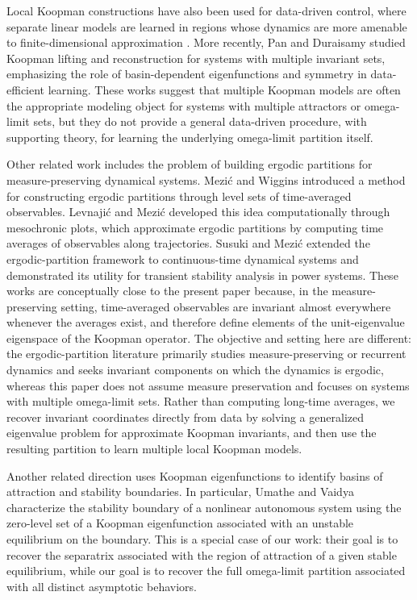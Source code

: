 \documentclass[letterpaper, 10 pt, conference]{ieeeconf}
\begin{document}
Local Koopman constructions have also been used for data-driven control, where separate linear models are learned in regions whose dynamics are more amenable to finite-dimensional approximation \cite{GM-MC-XT-TM:19}. More recently, Pan and Duraisamy \cite{SP-KD:24} studied Koopman lifting and reconstruction for systems with multiple invariant sets, emphasizing the role of basin-dependent eigenfunctions and symmetry in data-efficient learning. These works suggest that multiple Koopman models are often the appropriate modeling object for systems with multiple attractors or omega-limit sets, but they do not provide a general data-driven procedure, with supporting theory, for learning the underlying omega-limit partition itself.

Other related work includes the problem of building ergodic partitions for measure-preserving dynamical systems. Mezi{\'c} and Wiggins \cite{IM-SW:99} introduced a method for constructing ergodic partitions through level sets of time-averaged observables. Levnaji{\'c} and Mezi{\'c} \cite{ZL-IM:10} developed this idea computationally through mesochronic plots, which approximate ergodic partitions by computing time averages of observables along trajectories. Susuki and Mezi{\'c} \cite{YS-IM:09} extended the ergodic-partition framework to continuous-time dynamical systems and demonstrated its utility for transient stability analysis in power systems. These works are conceptually close to the present paper because, in the measure-preserving setting, time-averaged observables are invariant almost everywhere whenever the averages exist, and therefore define elements of the unit-eigenvalue eigenspace of the Koopman operator. The objective and setting here are different: the ergodic-partition literature primarily studies measure-preserving or recurrent dynamics and seeks invariant components on which the dynamics is ergodic, whereas this paper does not assume measure preservation and focuses on systems with multiple omega-limit sets. Rather than computing long-time averages, we recover invariant coordinates directly from data by solving a generalized eigenvalue problem for approximate Koopman invariants, and then use the resulting partition to learn multiple local Koopman models.

Another related direction uses Koopman eigenfunctions to identify basins of attraction and stability boundaries. In particular, Umathe and Vaidya \cite{BU-UV:23} characterize the stability boundary of a nonlinear autonomous system using the zero-level set of a Koopman eigenfunction associated with an unstable equilibrium on the boundary. This is a special case of our work: their goal is to recover the separatrix associated with the region of attraction of a given stable equilibrium, while our goal is to recover the full omega-limit partition associated with all distinct asymptotic behaviors. 
\end{document}
